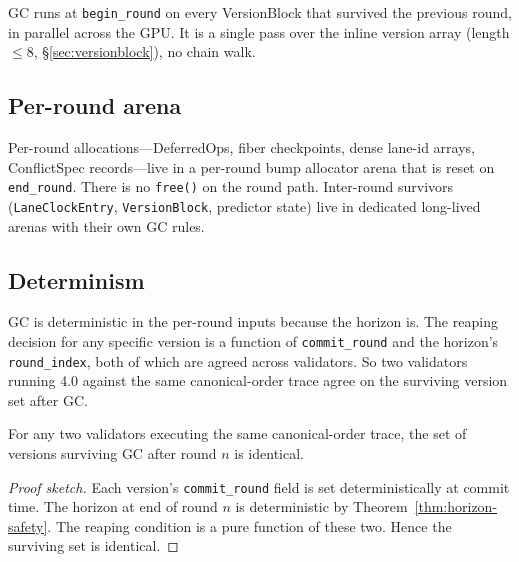 GC runs at \texttt{begin\_round} on every VersionBlock that survived
the previous round, in parallel across the GPU. It is a single pass
over the inline version array (length $\le 8$, \S\ref{sec:versionblock}),
no chain walk.

\subsection{Per-round arena}

Per-round allocations---DeferredOps, fiber checkpoints, dense lane-id
arrays, ConflictSpec records---live in a per-round bump allocator
arena that is reset on \texttt{end\_round}. There is no
\texttt{free()} on the round path. Inter-round survivors
(\texttt{LaneClockEntry}, \texttt{VersionBlock}, predictor state) live
in dedicated long-lived arenas with their own GC rules.

\subsection{Determinism}

GC is deterministic in the per-round inputs because the horizon is.
The reaping decision for any specific version is a function of
\texttt{commit\_round} and the horizon's \texttt{round\_index}, both
of which are agreed across validators. So two validators running 4.0
against the same canonical-order trace agree on the surviving version
set after GC.

\begin{lemma}[GC determinism]
\label{lem:gc-det}
For any two validators executing the same canonical-order trace, the
set of versions surviving GC after round $n$ is identical.
\end{lemma}
\begin{proof}[Proof sketch]
Each version's \texttt{commit\_round} field is set deterministically
at commit time. The horizon at end of round $n$ is deterministic by
Theorem~\ref{thm:horizon-safety}. The reaping condition is a pure
function of these two. Hence the surviving set is identical.
\end{proof}

